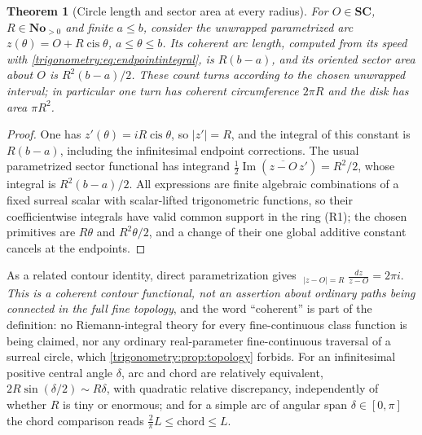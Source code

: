 \documentclass[11pt,letterpaper]{article}
\numberwithin{equation}{section}
\newtheorem{theorem}{Theorem}[section]
\theoremstyle{definition}
\theoremstyle{remark}
\newcommand{\No}{\mathbf{No}}
\newcommand{\SC}{\mathbf{SC}}
\newcommand{\im}{\operatorname{Im}}
\newcommand{\cis}{\operatorname{cis}}
\newcommand{\HInt}{\mathop{\overset{\scriptscriptstyle H}{\int}}\nolimits}
\begin{document}
\begin{theorem}[Circle length and sector area at every radius]\label{trigonometry:thm:arcs}
For $O\in\SC$, $R\in\No_{>0}$ and finite $a\le b$, consider the unwrapped parametrized arc
$z(\theta)=O+R\cis\theta$, $a\le\theta\le b$. Its coherent arc length, computed from its speed with
\cref{trigonometry:eq:endpointintegral}, is $R(b-a)$, and its oriented sector area about $O$ is
$R^2(b-a)/2$. These count turns according to the chosen unwrapped interval; in particular one turn
has coherent circumference $2\pi R$ and the disk has area $\pi R^2$.
\end{theorem}
\begin{proof}
One has $z'(\theta)=iR\cis\theta$, so $|z'|=R$, and the integral of this constant is $R(b-a)$,
including the infinitesimal endpoint corrections. The usual parametrized sector functional has
integrand $\tfrac12\im(\overline{z-O}\,z')=R^2/2$, whose integral is $R^2(b-a)/2$. All expressions
are finite algebraic combinations of a fixed surreal scalar with scalar-lifted trigonometric
functions, so their coefficientwise integrals have valid common support in the ring (R1); the
chosen primitives are $R\theta$ and $R^2\theta/2$, and a change of their one global additive
constant cancels at the endpoints.
\end{proof}
As a related contour identity, direct parametrization gives
$\HInt_{|z-O|=R}\frac{dz}{z-O}=2\pi i$. \emph{This is a coherent contour functional, not an
assertion about ordinary paths being connected in the full fine topology}, and the word
``coherent'' is part of the definition: no Riemann-integral theory for every fine-continuous class
function is being claimed, nor any ordinary real-parameter fine-continuous traversal of a surreal
circle, which \cref{trigonometry:prop:topology} forbids. For an infinitesimal positive central
angle $\delta$, arc and chord are relatively equivalent, $2R\sin(\delta/2)\sim R\delta$, with
quadratic relative discrepancy, independently of whether $R$ is tiny or enormous; and for a simple
arc of angular span $\delta\in[0,\pi]$ the chord comparison reads
$\frac2\pi L\le\text{chord}\le L$.
\end{document}
